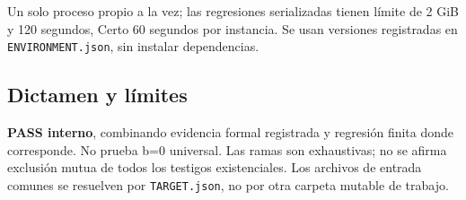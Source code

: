 \documentclass[11pt]{article}
\begin{document}
Un solo proceso propio a la vez; las regresiones serializadas tienen
límite de 2 GiB y 120 segundos, Certo 60 segundos por instancia. Se usan
versiones registradas en \nolinkurl{ENVIRONMENT.json}, sin instalar
dependencias.

\subsection{Dictamen y límites}\label{dictamen-y-luxedmites}

\textbf{PASS interno}, combinando evidencia formal registrada y
regresión finita donde corresponde. No prueba b=0 universal. Las ramas
son exhaustivas; no se afirma exclusión mutua de todos los testigos
existenciales. Los archivos de entrada comunes se resuelven por
\nolinkurl{TARGET.json}, no por otra carpeta mutable de trabajo.
\end{document}
